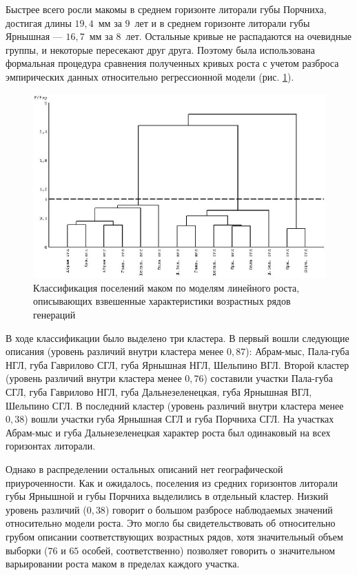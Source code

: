Быстрее   всего   росли   макомы   в   среднем   горизонте   литорали   губы Порчниха, достигая длины $19,4$~мм за $9$~лет и в среднем горизонте литорали губы Ярнышная --- $16,7$~мм за $8$~лет. 
Остальные кривые не распадаются на очевидные группы, и некоторые пересекают   друг   друга.   
Поэтому   была   использована   формальная   процедура   сравнения полученных   кривых   роста   с   учетом   разброса   эмпирических   данных   относительно регрессионной модели (рис. \ref{ris:dendrogramma_linear_all_gorizonts}).
    \begin{figure}[hbp]
        \includegraphics[width=\textwidth]{../Barenc_Sea/growth_from_MSc/dendrogramma_sravnenie_rosta_linear_all_gorizonts.jpg}
    \caption{Классификация поселений маком по моделям линейного роста, описывающих взвешенные характеристики возрастных рядов генераций}
    \label{ris:dendrogramma_linear_all_gorizonts}
    \end{figure}

В   ходе   классификации   было   выделено   три   кластера.   
В   первый   вошли   следующие описания (уровень различий внутри кластера менее $0,87$): Абрам-мыс, Пала-губа НГЛ, губа Гаврилово   СГЛ,   губа   Ярнышная   НГЛ,   Шельпино   ВГЛ.   
Второй   кластер   (уровень   различий внутри кластера менее $0,76$) составили участки Пала-губа СГЛ, губа Гаврилово НГЛ, губа Дальнезеленецкая,   губа   Ярнышная   ВГЛ,   Шельпино   СГЛ.   
В   последний   кластер   (уровень различий внутри кластера менее $0,38$) вошли участки губа Ярнышная СГЛ и губа Порчниха СГЛ. 
На участках Абрам-мыс и губа Дальнезеленецкая характер роста был одинаковый на всех горизонтах литорали. 

Однако в распределении остальных описаний нет географической приуроченности. 
Как и ожидалось, поселения  из средних горизонтов литорали губы Ярнышной и губы Порчниха   выделились   в   отдельный   кластер.   
Низкий   уровень   различий   ($0,38$)   говорит   о большом   разбросе   наблюдаемых   значений   относительно   модели   роста.   
Это   могло   бы свидетельствовать   об   относительно   грубом   описании   соответствующих   возрастных   рядов, хотя   значительный объем  выборки ($76$  и $65$  особей, соответственно)  позволяет  говорить  о значительном варьировании роста маком в пределах каждого участка.

